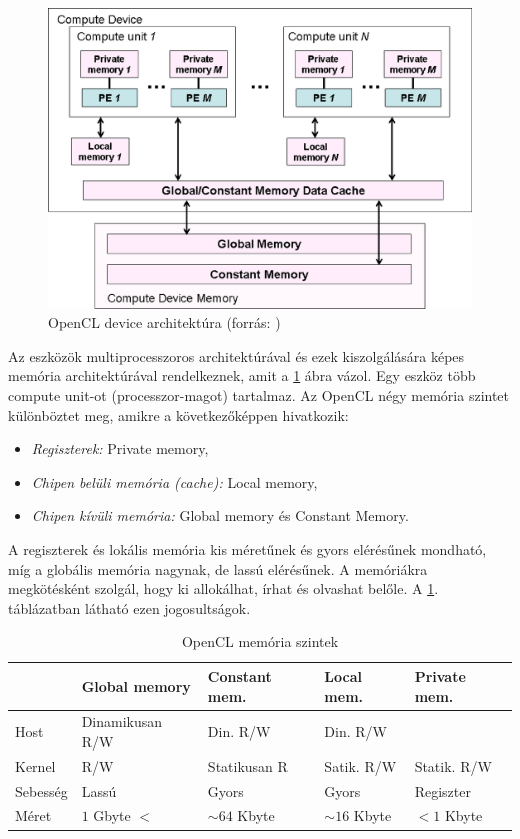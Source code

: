 	\begin{figure}[!ht]
		\centering
		\includegraphics[width=0.6\columnwidth]{figures/eps/device.eps}
		\caption[OpenCL device architektúra]{OpenCL device architektúra (forrás: \cite{opencl})} 
		\label{fig:device} 
	\end{figure}
	Az eszközök multiprocesszoros architektúrával és ezek kiszolgálására képes
	memória architektúrával rendelkeznek, amit a \ref{fig:device} ábra vázol.
	Egy eszköz több compute unit-ot (processzor-magot) tartalmaz.
	Az OpenCL négy memória szintet különböztet meg, amikre a
	következőképpen hivatkozik:
	\begin{itemize}
		\item \emph{Regiszterek:} Private memory,
		\item \emph{Chipen belüli memória (cache):} Local memory,
		\item \emph{Chipen kívüli memória:} Global memory és Constant Memory.
	\end{itemize}
	A regiszterek és lokális memória kis méretűnek és gyors elérésűnek mondható, míg
	a globális memória nagynak, de lassú elérésűnek.
	A memóriákra megkötésként szolgál, hogy ki allokálhat, írhat és olvashat
	belőle. A \ref{table:mem}. táblázatban látható ezen jogosultságok.
	\begin{table}[!h]
	\caption{OpenCL memória szintek}
	\label{table:mem}
	\centering
	\begin{tabular}{l|l|l|l|l}
			 & Global memory & Constant mem. & Local mem. & Private mem.\\ \hline
		Host & Dinamikusan R/W & Din. R/W & Din. R/W & \\
		Kernel & R/W & Statikusan R & Satik. R/W & Statik. R/W\\
		Sebesség & Lassú & Gyors & Gyors & Regiszter\\
		Méret & $1$ Gbyte $<$ & $\sim64$ Kbyte& $\sim16$ Kbyte & $<1$ Kbyte
	\end{tabular}
	\end{table}
	
